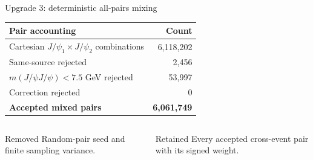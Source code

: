 \documentclass[11pt,aspectratio=169]{beamer}
\begin{document}
\begin{frame}[label=p08]{Upgrade 3: deterministic all-pairs mixing}
\vspace{4pt}
\begin{center}
\begin{tabular}{lr}
\toprule
Pair accounting & Count \\
\midrule
Cartesian $J/\psi_1\times J/\psi_2$ combinations & 6,118,202 \\
Same-source rejected & 2,456 \\
$m(J/\psi J/\psi)<7.5$ GeV rejected & 53,997 \\
Correction rejected & 0 \\
\textbf{Accepted mixed pairs} & \textbf{6,061,749} \\
\bottomrule
\end{tabular}
\end{center}
\vfill
\begin{columns}[T]
\begin{exampleblock}{Removed}
Random-pair seed and finite sampling variance.
\end{exampleblock}
\begin{block}{Retained}
Every accepted cross-event pair with its signed weight.
\end{block}
\end{columns}
\vfill
\centering{}
\end{frame}
\end{document}
